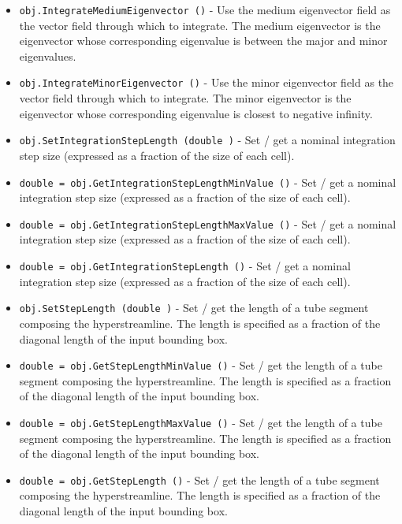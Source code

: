 \begin{itemize}
\item  \verb|obj.IntegrateMediumEigenvector ()| -  Use the medium eigenvector field as the vector field through which
 to integrate. The medium eigenvector is the eigenvector whose
 corresponding eigenvalue is between the major and minor
 eigenvalues.

\item  \verb|obj.IntegrateMinorEigenvector ()| -  Use the minor eigenvector field as the vector field through which
 to integrate. The minor eigenvector is the eigenvector whose
 corresponding eigenvalue is closest to negative infinity.

\item  \verb|obj.SetIntegrationStepLength (double )| -  Set / get a nominal integration step size (expressed as a fraction of
 the size of each cell).

\item  \verb|double = obj.GetIntegrationStepLengthMinValue ()| -  Set / get a nominal integration step size (expressed as a fraction of
 the size of each cell).

\item  \verb|double = obj.GetIntegrationStepLengthMaxValue ()| -  Set / get a nominal integration step size (expressed as a fraction of
 the size of each cell).

\item  \verb|double = obj.GetIntegrationStepLength ()| -  Set / get a nominal integration step size (expressed as a fraction of
 the size of each cell).

\item  \verb|obj.SetStepLength (double )| -  Set / get the length of a tube segment composing the
 hyperstreamline. The length is specified as a fraction of the
 diagonal length of the input bounding box.

\item  \verb|double = obj.GetStepLengthMinValue ()| -  Set / get the length of a tube segment composing the
 hyperstreamline. The length is specified as a fraction of the
 diagonal length of the input bounding box.

\item  \verb|double = obj.GetStepLengthMaxValue ()| -  Set / get the length of a tube segment composing the
 hyperstreamline. The length is specified as a fraction of the
 diagonal length of the input bounding box.

\item  \verb|double = obj.GetStepLength ()| -  Set / get the length of a tube segment composing the
 hyperstreamline. The length is specified as a fraction of the
 diagonal length of the input bounding box.


\end{itemize}
